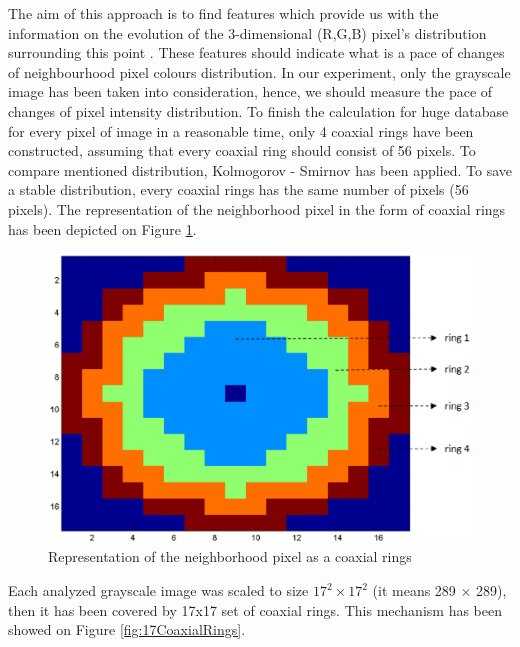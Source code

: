 \documentclass[review,12pt]{elsarticle}
\begin{document}
The aim of this approach is to find features which provide us with the information on the evolution of the 3-dimensional (R,G,B) pixel’s distribution surrounding this point \citep{Kruk2015}. These features should indicate  what is a pace of changes of neighbourhood pixel colours distribution. In our experiment, only the grayscale image has been taken into consideration, hence, we should measure the pace of changes of pixel intensity distribution. To finish the calculation for huge database for every pixel of image in  a reasonable time, only 4 coaxial rings have been constructed, assuming that every coaxial ring should consist of 56 pixels. To compare mentioned distribution, Kolmogorov - Smirnov has been applied. To save a stable distribution, every coaxial rings has the same number of pixels (56 pixels). The representation of the neighborhood pixel in the form of coaxial rings has been depicted on Figure \ref{fig:CoaxialRings}.

\begin{figure}
\center
\includegraphics[scale=0.6]{images/CoaxialRing.eps}
\caption{Representation of the neighborhood pixel as a coaxial rings}
\label{fig:CoaxialRings}
\end{figure}

Each analyzed grayscale image was scaled to size $17^{2} \times 17^{2}$ (it means 289 $ \times $ 289), then it has been covered by 17x17 set of coaxial rings. This mechanism has been showed on Figure \ref{fig:17CoaxialRings}.
\end{document}

